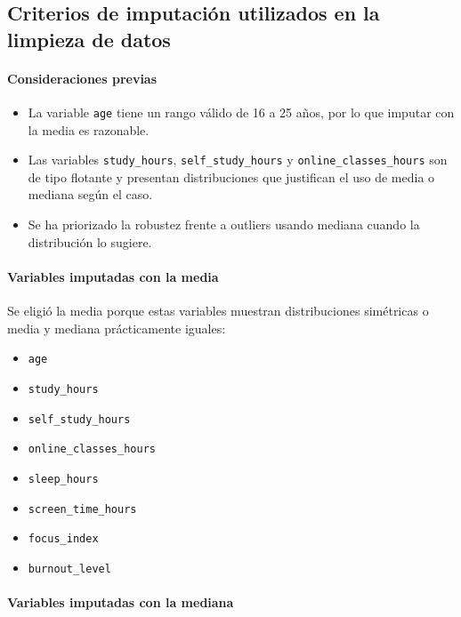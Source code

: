 \documentclass[11pt]{article}
\providecommand{\tightlist}{%
      \setlength{\itemsep}{0pt}\setlength{\parskip}{0pt}}
\begin{document}
    \subsection{Criterios de imputación utilizados en la limpieza de
datos}\label{criterios-de-imputaciuxf3n-utilizados-en-la-limpieza-de-datos}

\paragraph{Consideraciones previas}\label{consideraciones-previas}

\begin{itemize}
\tightlist
\item
  La variable \texttt{age} tiene un rango válido de 16 a 25 años, por lo
  que imputar con la media es razonable.
\item
  Las variables \texttt{study\_hours}, \texttt{self\_study\_hours} y
  \texttt{online\_classes\_hours} son de tipo flotante y presentan
  distribuciones que justifican el uso de media o mediana según el caso.
\item
  Se ha priorizado la robustez frente a outliers usando mediana cuando
  la distribución lo sugiere.
\end{itemize}

\paragraph{Variables imputadas con la
media}\label{variables-imputadas-con-la-media}

Se eligió la media porque estas variables muestran distribuciones
simétricas o media y mediana prácticamente iguales:

\begin{itemize}
\tightlist
\item
  \texttt{age}
\item
  \texttt{study\_hours}
\item
  \texttt{self\_study\_hours}
\item
  \texttt{online\_classes\_hours}
\item
  \texttt{sleep\_hours}
\item
  \texttt{screen\_time\_hours}
\item
  \texttt{focus\_index}
\item
  \texttt{burnout\_level}
\end{itemize}

\paragraph{Variables imputadas con la
mediana}\label{variables-imputadas-con-la-mediana}
\end{document}
